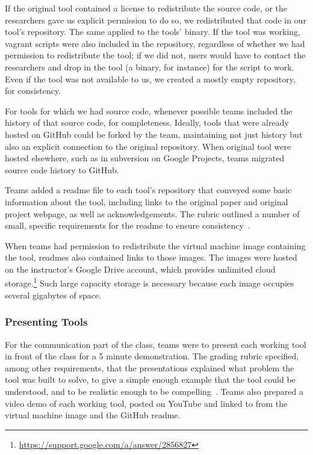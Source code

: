 \documentclass[10pt,conference]{IEEEtran}
\begin{document}
If the original tool contained a license to redistribute
the source code, or the researchers gave us explicit
permission to do so, we redistributed that code 
in our tool's repository.
The same applied to the tools' binary.
If the tool was working, 
vagrant scripts were also included in the repository,
regardless of whether we had permission to redistribute
the tool; if we did not, users would have to contact the 
researchers and drop in the tool (a binary, for instance)
for the script to work.
Even if the tool was not available to us, we created
a mostly empty repository, for consistency.


For tools for which we had source code,
whenever possible teams included the history
of that source code, for completeness.
Ideally, tools that were already hosted
on GitHub could be forked by the team,
maintaining not just history but also an 
explicit connection to the original repository.
When original tool were hosted elsewhere, such
as in subversion on Google Projects, 
teams migrated source code history to GitHub.

Teams added a readme file to each tool's repository
that conveyed some basic information about
the tool, including 
links to the original paper and
original project webpage, 
as well as acknowledgements.
The rubric outlined a number of small,
specific requirements for the readme to
ensure consistency~\cite{github}.

When teams had permission to redistribute
the virtual machine image containing the tool,
readmes also contained links to those images.
The images were hosted on the instructor's 
Google Drive account, which provides unlimited
cloud storage.\footnote{\url{https://support.google.com/a/answer/2856827}}
Such large capacity storage is necessary because each
image occupies several gigabytes of space.

\subsubsection{Presenting Tools}

For the communication part of the class,
teams were to present each working tool in front of the class
for a 5 minute demonstration.
The grading rubric specified, among other requirements,
that the presentations explained what problem the 
tool was built to solve, to give a simple enough
example that the tool could be understood,
and to be realistic enough to be 
compelling~\cite{presentation}.
Teams also prepared a video demo of each working tool,
posted on YouTube and linked to from the virtual machine
image and the GitHub readme.
\end{document}
